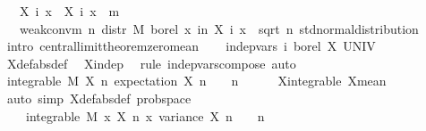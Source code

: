 {\ \ \ {\isachardoublequoteopen}X{\isacharprime}\ i\ x\ {\isasymequiv}\ X\ i\ x\ {\isacharminus}\ m{\isachardoublequoteclose}\isanewline
\ \ \ {\isachardoublequoteopen}weak{\isacharunderscore}conv{\isacharunderscore}m\ {\isacharparenleft}{\isasymlambda}n{\isachardot}\ distr\ M\ borel\ {\isacharparenleft}{\isasymlambda}x{\isachardot}\ {\isacharparenleft}{\isasymSum}i{\isacharless}n{\isachardot}\ X{\isacharprime}\ i\ x{\isacharparenright}\ {\isacharslash}\ sqrt\ {\isacharparenleft}n{\isacharasterisk}{\isasymsigma}\ std{\isacharunderscore}normal{\isacharunderscore}distribution{\isachardoublequoteclose}\isanewline
%
\isadelimproof
%
\endisadelimproof
%
\isatagproof
{}\isamarkupfalse%
\ {\isacharparenleft}intro\ central{\isacharunderscore}limit{\isacharunderscore}theorem{\isacharunderscore}zero{\isacharunderscore}mean{\isacharparenright}\isanewline
\ \ \isamarkupfalse%
\ {\isachardoublequoteopen}indep{\isacharunderscore}vars\ {\isacharparenleft}{\isasymlambda}i{\isachardot}\ borel{\isacharparenright}\ X{\isacharprime}\ UNIV{\isachardoublequoteclose}\isanewline
\ \ \ \ \isamarkupfalse%
\ X{\isacharprime}{\isacharunderscore}def{\isacharbrackleft}abs{\isacharunderscore}def{\isacharbrackright}\ \isamarkupfalse%
\ X{\isacharunderscore}indep\ \isamarkupfalse%
\ {\isacharparenleft}rule\ indep{\isacharunderscore}vars{\isacharunderscore}compose{}{\isacharparenright}\ auto\isanewline
\ \ \isamarkupfalse%
\ {\isachardoublequoteopen}integrable\ M\ {\isacharparenleft}X{\isacharprime}\ n{\isacharparenright}{\isachardoublequoteclose}\ {\isachardoublequoteopen}expectation\ {\isacharparenleft}X{\isacharprime}\ n{\isacharparenright}\ {\isacharequal}\ {}{\isachardoublequoteclose}\ \ n\isanewline
\ \ \ \ \isamarkupfalse%
\ X{\isacharunderscore}integrable\ X{\isacharunderscore}mean\ \isamarkupfalse%
\ {\isacharparenleft}auto\ simp{\isacharcolon}\ X{\isacharprime}{\isacharunderscore}def{\isacharbrackleft}abs{\isacharunderscore}def{\isacharbrackright}\ prob{\isacharunderscore}space{\isacharparenright}\isanewline
\ \ \isamarkupfalse%
\ {\isachardoublequoteopen}{\isasymsigma}\ {\isachargreater}\ {}{\isachardoublequoteclose}\ {\isachardoublequoteopen}integrable\ M\ {\isacharparenleft}{\isasymlambda}x{\isachardot}\ {\isacharparenleft}X{\isacharprime}\ n\ x{\isacharparenright}\ {\isachardoublequoteopen}variance\ {\isacharparenleft}X{\isacharprime}\ n{\isacharparenright}\ {\isacharequal}\ {\isasymsigma}\ \ n\isanewline
}
